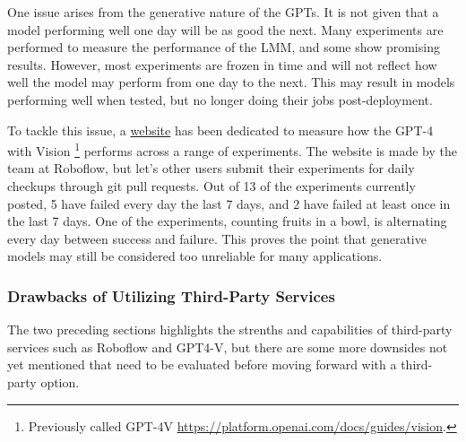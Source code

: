 One issue arises from the generative nature of the GPTs. It is not given that a model performing well one day will be as good the next. Many experiments are performed to measure the performance of the LMM, and some show promising results. However, most experiments are frozen in time and will not reflect how well the model may perform from one day to the next. This may result in models performing well when tested, but no longer doing their jobs post-deployment.

To tackle this issue, a \href{https://www.gptcheckup.com/}{website} has been dedicated to measure how the GPT-4 with Vision \footnote{Previously called GPT-4V \href{https://platform.openai.com/docs/guides/vision}{https://platform.openai.com/docs/guides/vision}.} performs across a range of experiments. The website is made by the team at Roboflow, but let's other users submit their experiments for daily checkups through git pull requests. Out of 13 of the experiments currently posted, 5 have failed every day the last 7 days, and 2 have failed at least once in the last 7 days. One of the experiments, counting fruits in a bowl, is alternating every day between success and failure. This proves the point that generative models may still be considered too unreliable for many applications.

\subsubsection{Drawbacks of Utilizing Third-Party Services}
The two preceding sections highlights the strenths and capabilities of third-party services such as Roboflow and GPT4-V, but there are some more downsides not yet mentioned that need to be evaluated before moving forward with a third-party option.

